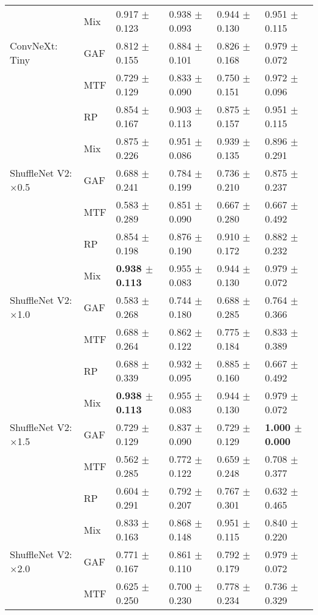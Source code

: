 \begin{longtable}[t]{llllll}
 & Mix & 0.917 $\pm$ 0.123 & 0.938 $\pm$ 0.093 & 0.944 $\pm$ 0.130 & 0.951 $\pm$ 0.115 \\
ConvNeXt: Tiny & GAF & 0.812 $\pm$ 0.155 & 0.884 $\pm$ 0.101 & 0.826 $\pm$ 0.168 & 0.979 $\pm$ 0.072 \\
 & MTF & 0.729 $\pm$ 0.129 & 0.833 $\pm$ 0.090 & 0.750 $\pm$ 0.151 & 0.972 $\pm$ 0.096 \\
 & RP & 0.854 $\pm$ 0.167 & 0.903 $\pm$ 0.113 & 0.875 $\pm$ 0.157 & 0.951 $\pm$ 0.115 \\
 & Mix & 0.875 $\pm$ 0.226 & 0.951 $\pm$ 0.086 & 0.939 $\pm$ 0.135 & 0.896 $\pm$ 0.291 \\
ShuffleNet V2: $\times$0.5 & GAF & 0.688 $\pm$ 0.241 & 0.784 $\pm$ 0.199 & 0.736 $\pm$ 0.210 & 0.875 $\pm$ 0.237 \\
 & MTF & 0.583 $\pm$ 0.289 & 0.851 $\pm$ 0.090 & 0.667 $\pm$ 0.280 & 0.667 $\pm$ 0.492 \\
 & RP & 0.854 $\pm$ 0.198 & 0.876 $\pm$ 0.190 & 0.910 $\pm$ 0.172 & 0.882 $\pm$ 0.232 \\
 & Mix & \textbf{0.938 $\pm$ 0.113} & 0.955 $\pm$ 0.083 & 0.944 $\pm$ 0.130 & 0.979 $\pm$ 0.072 \\
ShuffleNet V2: $\times$1.0 & GAF & 0.583 $\pm$ 0.268 & 0.744 $\pm$ 0.180 & 0.688 $\pm$ 0.285 & 0.764 $\pm$ 0.366 \\
 & MTF & 0.688 $\pm$ 0.264 & 0.862 $\pm$ 0.122 & 0.775 $\pm$ 0.184 & 0.833 $\pm$ 0.389 \\
 & RP & 0.688 $\pm$ 0.339 & 0.932 $\pm$ 0.095 & 0.885 $\pm$ 0.160 & 0.667 $\pm$ 0.492 \\
 & Mix & \textbf{0.938 $\pm$ 0.113} & 0.955 $\pm$ 0.083 & 0.944 $\pm$ 0.130 & 0.979 $\pm$ 0.072 \\
ShuffleNet V2: $\times$1.5 & GAF & 0.729 $\pm$ 0.129 & 0.837 $\pm$ 0.090 & 0.729 $\pm$ 0.129 & \textbf{1.000 $\pm$ 0.000} \\
 & MTF & 0.562 $\pm$ 0.285 & 0.772 $\pm$ 0.122 & 0.659 $\pm$ 0.248 & 0.708 $\pm$ 0.377 \\
 & RP & 0.604 $\pm$ 0.291 & 0.792 $\pm$ 0.207 & 0.767 $\pm$ 0.301 & 0.632 $\pm$ 0.465 \\
 & Mix & 0.833 $\pm$ 0.163 & 0.868 $\pm$ 0.148 & 0.951 $\pm$ 0.115 & 0.840 $\pm$ 0.220 \\
ShuffleNet V2: $\times$2.0 & GAF & 0.771 $\pm$ 0.167 & 0.861 $\pm$ 0.110 & 0.792 $\pm$ 0.179 & 0.979 $\pm$ 0.072 \\
 & MTF & 0.625 $\pm$ 0.250 & 0.700 $\pm$ 0.230 & 0.778 $\pm$ 0.234 & 0.736 $\pm$ 0.329 \\

\end{longtable}

